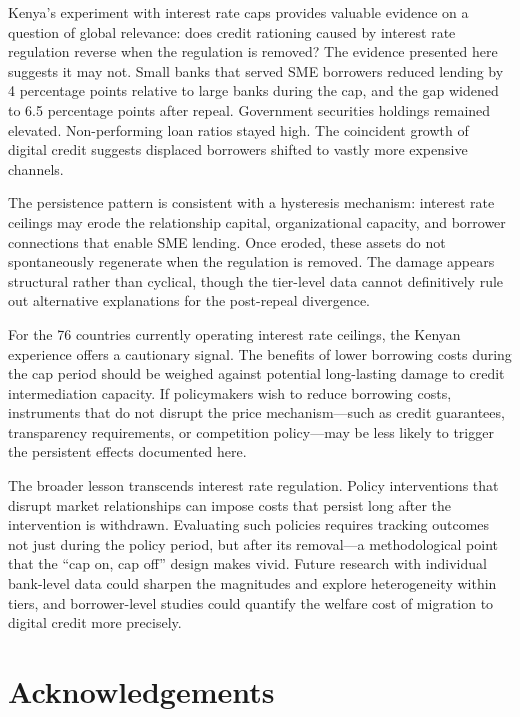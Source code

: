 \documentclass[12pt]{article}
\begin{document}
Kenya's experiment with interest rate caps provides valuable evidence on a question of global relevance: does credit rationing caused by interest rate regulation reverse when the regulation is removed? The evidence presented here suggests it may not. Small banks that served SME borrowers reduced lending by 4 percentage points relative to large banks during the cap, and the gap widened to 6.5 percentage points after repeal. Government securities holdings remained elevated. Non-performing loan ratios stayed high. The coincident growth of digital credit suggests displaced borrowers shifted to vastly more expensive channels.

The persistence pattern is consistent with a hysteresis mechanism: interest rate ceilings may erode the relationship capital, organizational capacity, and borrower connections that enable SME lending. Once eroded, these assets do not spontaneously regenerate when the regulation is removed. The damage appears structural rather than cyclical, though the tier-level data cannot definitively rule out alternative explanations for the post-repeal divergence.

For the 76 countries currently operating interest rate ceilings, the Kenyan experience offers a cautionary signal. The benefits of lower borrowing costs during the cap period should be weighed against potential long-lasting damage to credit intermediation capacity. If policymakers wish to reduce borrowing costs, instruments that do not disrupt the price mechanism---such as credit guarantees, transparency requirements, or competition policy---may be less likely to trigger the persistent effects documented here.

The broader lesson transcends interest rate regulation. Policy interventions that disrupt market relationships can impose costs that persist long after the intervention is withdrawn. Evaluating such policies requires tracking outcomes not just during the policy period, but after its removal---a methodological point that the ``cap on, cap off'' design makes vivid. Future research with individual bank-level data could sharpen the magnitudes and explore heterogeneity within tiers, and borrower-level studies could quantify the welfare cost of migration to digital credit more precisely.



\section*{Acknowledgements}
\end{document}
